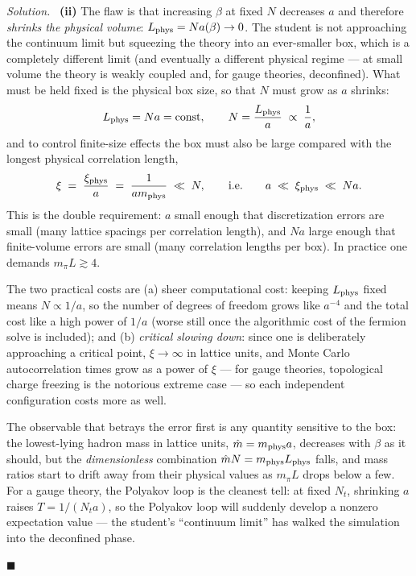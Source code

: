 \documentclass[11pt]{article}
\newenvironment{solution}{\par\smallskip\noindent\textit{Solution.}\ }{\hfill$\blacksquare$\par\smallskip}
\begin{document}
\begin{solution}
\textbf{(ii)} The flaw is that increasing $\beta$ at fixed $N$ decreases $a$ and therefore \emph{shrinks the physical volume}: $L_{\rm phys} = N a(\beta) \to 0$. The student is not approaching the continuum limit but squeezing the theory into an ever-smaller box, which is a completely different limit (and eventually a different physical regime --- at small volume the theory is weakly coupled and, for gauge theories, deconfined). What must be held fixed is the physical box size, so that $N$ must grow as $a$ shrinks:
\begin{equation}
L_{\rm phys} = N a = \text{const}, \qquad N = \frac{L_{\rm phys}}{a} \;\propto\; \frac{1}{a},
\end{equation}
and to control finite-size effects the box must also be large compared with the longest physical correlation length,
\begin{equation}
\xi \;=\; \frac{\xi_{\rm phys}}{a} \;=\; \frac{1}{a m_{\rm phys}} \;\ll\; N,
\qquad\text{i.e.}\qquad a \;\ll\; \xi_{\rm phys} \;\ll\; N a .
\end{equation}
This is the double requirement: $a$ small enough that discretization errors are small (many lattice spacings per correlation length), and $Na$ large enough that finite-volume errors are small (many correlation lengths per box). In practice one demands $m_\pi L \gtrsim 4$.

The two practical costs are (a) sheer computational cost: keeping $L_{\rm phys}$ fixed means $N \propto 1/a$, so the number of degrees of freedom grows like $a^{-4}$ and the total cost like a high power of $1/a$ (worse still once the algorithmic cost of the fermion solve is included); and (b) \emph{critical slowing down}: since one is deliberately approaching a critical point, $\xi \to \infty$ in lattice units, and Monte Carlo autocorrelation times grow as a power of $\xi$ --- for gauge theories, topological charge freezing is the notorious extreme case --- so each independent configuration costs more as well.

The observable that betrays the error first is any quantity sensitive to the box: the lowest-lying hadron mass in lattice units, $\hat m = m_{\rm phys}a$, decreases with $\beta$ as it should, but the \emph{dimensionless} combination $\hat m N = m_{\rm phys} L_{\rm phys}$ falls, and mass ratios start to drift away from their physical values as $m_\pi L$ drops below a few. For a gauge theory, the Polyakov loop is the cleanest tell: at fixed $N_t$, shrinking $a$ raises $T = 1/(N_t a)$, so the Polyakov loop will suddenly develop a nonzero expectation value --- the student's ``continuum limit'' has walked the simulation into the deconfined phase.


\end{solution}
\end{document}
